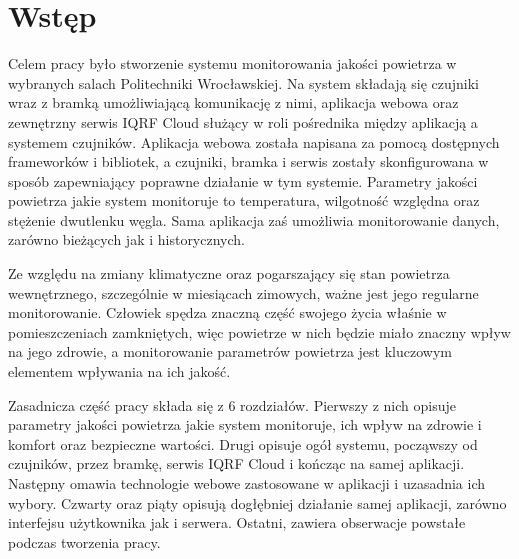\section{Wstęp}

Celem pracy było stworzenie systemu monitorowania jakości powietrza w wybranych salach Politechniki Wrocławskiej. Na system składają się
czujniki wraz z bramką umożliwiającą komunikację z nimi, aplikacja webowa oraz zewnętrzny serwis IQRF Cloud służący w roli pośrednika
między aplikacją a systemem czujników.
Aplikacja webowa została napisana za pomocą dostępnych frameworków i bibliotek, a czujniki, bramka i serwis zostały skonfigurowana
w sposób zapewniający poprawne działanie w tym systemie. Parametry jakości powietrza jakie system monitoruje 
to temperatura, wilgotność względna oraz stężenie dwutlenku węgla. Sama aplikacja zaś umożliwia monitorowanie danych, zarówno 
bieżących jak i historycznych.

Ze względu na zmiany klimatyczne oraz pogarszający się stan powietrza wewnętrznego, szczególnie w miesiącach zimowych, ważne jest jego 
regularne monitorowanie. Człowiek spędza znaczną część swojego życia właśnie w pomieszczeniach zamkniętych, więc powietrze w nich
będzie miało znaczny wpływ na jego zdrowie, a monitorowanie parametrów powietrza jest kluczowym elementem wpływania na ich jakość.

Zasadnicza część pracy składa się z 6 rozdziałów. Pierwszy z nich opisuje parametry jakości powietrza jakie system monitoruje, ich wpływ 
na zdrowie i komfort oraz bezpieczne wartości. Drugi opisuje ogół systemu, począwszy od czujników, przez bramkę, serwis IQRF Cloud i kończąc
na samej aplikacji. Następny omawia technologie webowe zastosowane w aplikacji i uzasadnia ich wybory. Czwarty oraz piąty opisują dogłębniej działanie
samej aplikacji, zarówno interfejsu użytkownika jak i serwera. Ostatni, zawiera obserwacje powstałe podczas tworzenia pracy.






